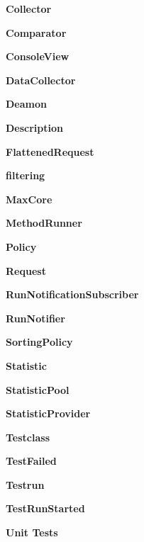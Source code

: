 \documentclass[i2]{oss}
\newcommand{\gloss}[1]{\textbf{#1}}
\begin{document}
\begin{description}
\item \gloss{Collector}

\item \gloss{Comparator}

\item \gloss{ConsoleView}

\item \gloss{DataCollector}

\item \gloss{Deamon}

\item \gloss{Description}

\item \gloss{FlattenedRequest}

\item \gloss{filtering}

\item \gloss{MaxCore}

\item \gloss{MethodRunner}

\item \gloss{Policy}

\item \gloss{Request}

\item \gloss{RunNotificationSubscriber}

\item \gloss{RunNotifier}

\item \gloss{SortingPolicy}

\item \gloss{Statistic}

\item \gloss{StatisticPool}

\item \gloss{StatisticProvider}

\item \gloss{Testclass}

\item \gloss{TestFailed}

\item \gloss{Testrun}

\item \gloss{TestRunStarted}

\item \gloss{Unit Tests}

 
\end{description}
\end{document}
